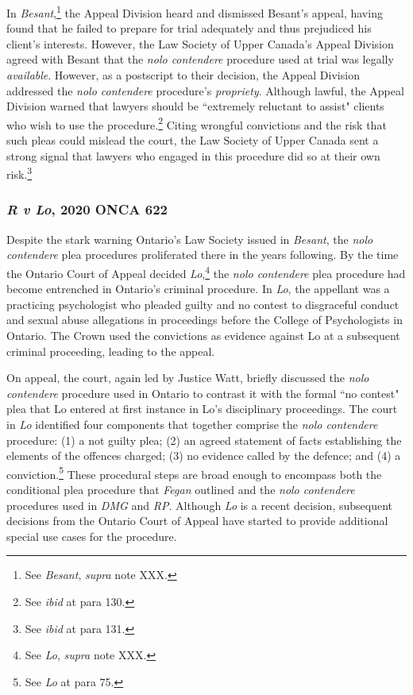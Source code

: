 In \textit{Besant},\footnote{See \textit{Besant}, \textit{supra} note XXX.} the Appeal Division heard and dismissed Besant's appeal, having found that he failed to prepare for trial adequately and thus prejudiced his client's interests. However, the Law Society of Upper Canada's Appeal Division agreed with Besant that the \textit{nolo contendere} procedure used at trial was legally \textit{available}. However, as a postscript to their decision, the Appeal Division addressed the \textit{nolo contendere} procedure's \textit{propriety}. Although lawful, the Appeal Division warned that lawyers should be ``extremely reluctant to assist" clients who wish to use the procedure.\footnote{See \textit{ibid} at para 130.} Citing wrongful convictions and the risk that such pleas could mislead the court, the Law Society of Upper Canada sent a strong signal that lawyers who engaged in this procedure did so at their own risk.\footnote{See \textit{ibid} at para 131.} 

\subsubsection{\textit{R v Lo}, 2020 ONCA 622}

Despite the stark warning Ontario's Law Society issued in \textit{Besant}, the \textit{nolo contendere} plea procedures proliferated there in the years following. By the time the Ontario Court of Appeal decided \textit{Lo},\footnote{See \textit{Lo}, \textit{supra} note XXX.} the \textit{nolo contendere} plea procedure had become entrenched in Ontario's criminal procedure. In \textit{Lo}, the appellant was a practicing psychologist who pleaded guilty and no contest to disgraceful conduct and sexual abuse allegations in proceedings before the College of Psychologists in Ontario. The Crown used the convictions as evidence against Lo at a subsequent criminal proceeding, leading to the appeal.

On appeal, the court, again led by Justice Watt, briefly discussed the \textit{nolo contendere} procedure used in Ontario to contrast it with the formal ``no contest" plea that Lo entered at first instance in Lo's disciplinary proceedings. The court in \textit{Lo} identified four components that together comprise the \textit{nolo contendere} procedure: (1) a not guilty plea; (2) an agreed statement of facts establishing the elements of the offences charged; (3) no evidence called by the defence; and (4) a conviction.\footnote{See \textit{Lo} at para 75.} These procedural steps are broad enough to encompass both the conditional plea procedure that \textit{Fegan} outlined and the \textit{nolo contendere} procedures used in \textit{DMG} and \textit{RP}. Although \textit{Lo} is a recent decision, subsequent decisions from the Ontario Court of Appeal have started to provide additional special use cases for the procedure.

